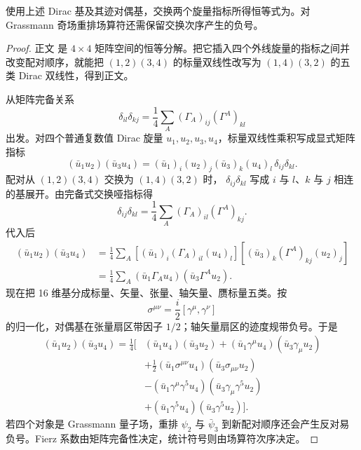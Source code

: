 \begin{proposition}
使用上述 Dirac 基及其迹对偶基，交换两个旋量指标所得恒等式为。对 Grassmann 奇场重排场算符还需保留交换次序产生的负号。
\end{proposition}
\begin{proof}
正文 是 $4\times4$ 矩阵空间的恒等分解。把它插入四个外线旋量的指标之间并改变配对顺序，就能把 $(1,2)(3,4)$ 的标量双线性改写为 $(1,4)(3,2)$ 的五类 Dirac 双线性，得到正文。



从矩阵完备关系
\begin{equation*}
\delta_{il}\delta_{kj}
=\frac14\sum_A(\Gamma_A)_{ij}(\Gamma^A)_{kl}
\end{equation*}
出发。对四个普通复数值 Dirac 旋量 $u_1,u_2,u_3,u_4$，标量双线性乘积写成显式矩阵指标
\begin{equation*}
(\bar u_1u_2)(\bar u_3u_4)
=(\bar u_1)_i(u_2)_j(\bar u_3)_k(u_4)_l\,
\delta_{ij}\delta_{kl}.
\end{equation*}
配对从 $(1,2)(3,4)$ 交换为 $(1,4)(3,2)$ 时， $\delta_{ij}\delta_{kl}$ 写成 $i$ 与 $l$、$k$ 与 $j$ 相连的基展开。由完备式交换哑指标得
\begin{equation*}
\delta_{ij}\delta_{kl}
=\frac14\sum_A(\Gamma_A)_{il}(\Gamma^A)_{kj}.
\end{equation*}
代入后
\begin{align*}
(\bar u_1u_2)(\bar u_3u_4)
&=\frac14\sum_A
[(\bar u_1)_i(\Gamma_A)_{il}(u_4)_l]
[(\bar u_3)_k(\Gamma^A)_{kj}(u_2)_j]\\
&=\frac14\sum_A
(\bar u_1\Gamma_Au_4)(\bar u_3\Gamma^Au_2).
\end{align*}
现在把 16 维基分成标量、矢量、张量、轴矢量、赝标量五类。按
\begin{equation*}
\sigma^{\mu\nu}=\frac{i}{2}[\gamma^\mu,\gamma^\nu]
\end{equation*}
的归一化，对偶基在张量扇区带因子 $1/2$；轴矢量扇区的迹度规带负号。于是
\begin{align*}
(\bar u_1u_2)(\bar u_3u_4)
=\frac14\Big[&
(\bar u_1u_4)(\bar u_3u_2)
+(\bar u_1\gamma^\mu u_4)(\bar u_3\gamma_\mu u_2)\\
&+\frac12(\bar u_1\sigma^{\mu\nu}u_4)
(\bar u_3\sigma_{\mu\nu}u_2)\\
&-(\bar u_1\gamma^\mu\gamma^5u_4)
(\bar u_3\gamma_\mu\gamma^5u_2)\\
&+(\bar u_1\gamma^5u_4)(\bar u_3\gamma^5u_2)
\Big].
\end{align*}
若四个对象是 Grassmann 量子场，重排 $\psi_2$ 与 $\bar\psi_3$ 到新配对顺序还会产生反对易负号。Fierz 系数由矩阵完备性决定，统计符号则由场算符次序决定。
\end{proof}

